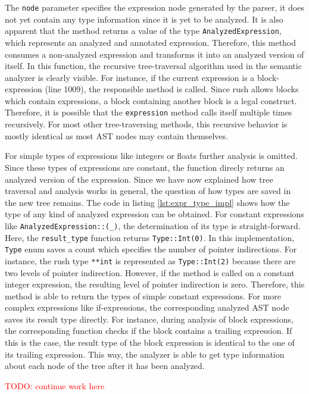 The \texttt{node} parameter specifies the expression node generated by the parser,
it does not yet contain any type information since it is yet to be analyzed.
It is also apparent that the method returns a value of the type \texttt{AnalyzedExpression},
which represents an analyzed and annotated expression.
Therefore, this method consumes a non-analyzed expression and transforms it into an analyzed version of itself.
In this function, the recursive tree-traversal algorithm used in the semantic analyzer is clearly visible.
For instance, if the current expression is a block-expression (line 1009), the responsible method is called.
Since rush allows blocks which contain expressions, a block containing another block is a legal construct.
Therefore, it is possible that the \texttt{expression} method calls itself multiple times recursively.
For most other tree-traversing methods, this recursive behavior is mostly identical as most AST nodes may contain themselves.

For simple types of expressions like integers or floats further analysis is omitted.
Since these types of expressions are constant, the function direcly returns an analyzed version of the expression.
Since we have now explained how tree traversal and analysis works in general, the question of how types are saved in the new tree remains.
The code in listing \ref{lst:expr_type_impl} shows how the type of any kind of analyzed expression can be obtained.
For constant expressions like \verb|AnalyzedExpression::(_)|, the determination of its type is straight-forward.
Here, the \texttt{result\_type} function returns \verb|Type::Int(0)|.
In this implementation, \texttt{Type} enum saves a count which specifies the number of pointer indirections.
For instance, the rush type \texttt{**int} is represented as \verb|Type::Int(2)| because there are two levels of pointer indirection.
However, if the method is called on a constant integer expression, the resulting level of pointer indirection is zero.
Therefore, this method is able to return the types of simple constant expressions.
For more complex expressions like if-expressions,
the corresponding analyzed AST node saves its result type directly.
For instance, during analysis of block expressions,
the corresponding function checks if the block contains a trailing expression.
If this is the case, the result type of the block expression is identical to the one of its trailing expression.
This way, the analyzer is able to get type information about each node of the tree after it has been analyzed.

\textcolor{red}{TODO: continue work here}
